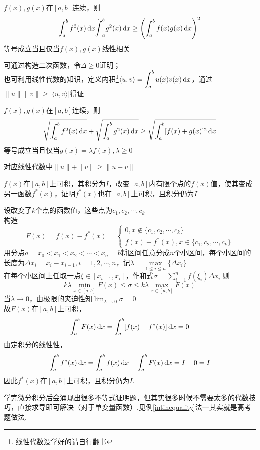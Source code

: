 \begin{theorem}
$f(x),g(x)$在$[a,b]$连续，则
\[\int_a^bf^2(x)\,\mathrm{d} x\dot \int_a^bg^2(x)\,\mathrm{d} x\geq\left(\int_a^bf(x)g(x)\,\mathrm{d} x\right)^2\]
等号成立当且仅当$f(x),g(x)$线性相关
\end{theorem}
\begin{analysis}
可通过构造二次函数，令$\Delta\geq0$证明；\\
也可利用线性代数的知识，定义内积\footnote{线性代数没学好的请自行翻书}$\displaystyle	\langle u,v\rangle=\int_a^bu(x)v(x)\,\mathrm{d} x$，通过$\|u\|\|v\|\geq|\langle u,v\rangle|$得证
\end{analysis}
\begin{theorem}
$f(x),g(x)$在$[a,b]$连续，则
\[\sqrt{\int_a^bf^2(x)\,\mathrm{d} x} + \sqrt{\int_a^bg^2(x)\,\mathrm{d} x}\geq\sqrt{\int_a^b[f(x)+g(x)]^2\,\mathrm{d} x}\]
等号成立当且仅当$g(x)=\lambda f(x),\lambda\geq 0$
\end{theorem}
\begin{analysis}
对应线性代数中$\|u\|+\|v\|\geq\|u+v\|$
\end{analysis}
\begin{example}
$f(x)$在$[a,b]$上可积，其积分为$I$，改变$[a,b]$内有限个点的$f(x)$值，使其变成另一函数$f^*(x)$，证明$f^*(x)$也在$[a,b]$上可积，且积分仍为$I$
\end{example}
\begin{analysis}
设改变了$k$个点的函数值，这些点为$c_1,c_2,\cdots,c_k$\\
构造
\[F(x)=f(x)-f^*(x)=\begin{cases}
0,x\notin\{c_1,c_2,\cdots,c_k\}\\
f(x)-f^*(x),x\in\{c_1,c_2,\cdots,c_k\}
\end{cases}\]
用分点$a=x_0<x_1<x_2<\cdots<x_n=b$将区间任意分成$n$个小区间，每个小区间的长度为$\Delta x_i=x_i-x_{i-1},i=1,2,\cdots,n$，记$\lambda = \underset{1\leq i\leq n}{\max}\{\Delta x_i\}$\\
在每个小区间上任取一点$\xi\in[x_{i-1},x_i]$，作和式$\displaystyle\sigma = \sum_{i=1}^{n}f(\xi_i)\Delta x_i$
则
\[k\lambda\underset{x\in[a,b]}{\min}F(x)\leq\sigma\leq k\lambda\underset{x\in[a,b]}{\max}F(x)\]
当$\lambda\to 0$，由极限的夹迫性知$\displaystyle\lim_{\lambda\to 0}\sigma=0$\\
故$F(x)$在$[a,b]$上可积，
\[\int_a^b F(x)\,\mathrm{d} x=\int_a^b[f(x)-f^*(x)]\,\mathrm{d} x=0\]
由定积分的线性性，
\[\int_a^b f^*(x)\,\mathrm{d} x=\int_a^b f(x)\,\mathrm{d} x-\int_a^b F(x)\,\mathrm{d} x=I-0=I\]
因此$f^*(x)$在$[a,b]$上可积，且积分仍为$I$.
\end{analysis}
\par 学完微分积分后会涌现出很多不等式证明题，但其实很多时候不需要太多的代数技巧，直接求导即可解决（对于单变量函数）.见例\ref{intinequality}法一其实就是高考题做法.
